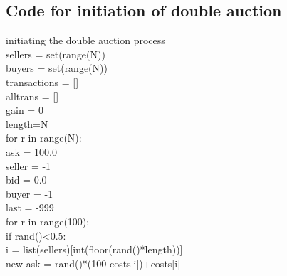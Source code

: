 \documentclass[10pt,a4paper,oneside]{report}
\begin{document}
\begin{appendix}
\begin{listing}
\section{Code for initiation of double auction}
initiating the double auction process\\
sellers = set(range(N))\\
buyers = set(range(N))\\
transactions = []\\
alltrans = []\\
gain = 0\\
length=N\\
for r in range(N):\\
    ask = 100.0\\
    seller = -1\\
    bid = 0.0\\
    buyer = -1\\
    last = -999\\
    for r in range(100):\\
        if rand()<0.5:\\
            i = list(sellers)[int(floor(rand()*length))]\\ %
            new ask = rand()*(100-costs[i])+costs[i]\\     %
           

\end{listing}
\end{appendix}
\end{document}
